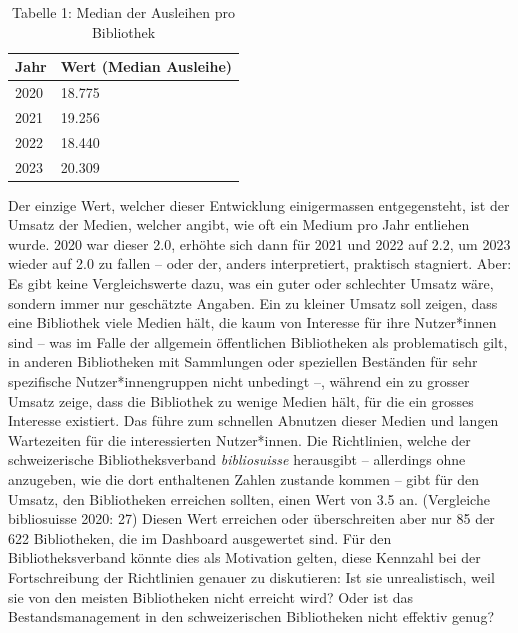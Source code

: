 \documentclass[a4paper,
fontsize=11pt,
oneside,
numbers=noperiodatend,
parskip=half-,
bibliography=totoc,
final
]{scrartcl}
\begin{document}
\begin{table}[]\centering
\begin{tabular}{|l|l|}
\hline
\textbf{Jahr} & \textbf{Wert (Median Ausleihe)} \\ \hline
2020          & 18.775                          \\ \hline
2021          & 19.256                          \\ \hline
2022          & 18.440                          \\ \hline
2023          & 20.309                          \\ \hline
\end{tabular}
\caption{Tabelle 1: Median der Ausleihen pro Bibliothek}
\end{table}

Der einzige Wert, welcher dieser Entwicklung einigermassen
entgegensteht, ist der Umsatz der Medien, welcher angibt, wie oft ein
Medium pro Jahr entliehen wurde. 2020 war dieser 2.0, erhöhte sich dann
für 2021 und 2022 auf 2.2, um 2023 wieder auf 2.0 zu fallen -- oder der,
anders interpretiert, praktisch stagniert. Aber: Es gibt keine
Vergleichswerte dazu, was ein guter oder schlechter Umsatz wäre, sondern
immer nur geschätzte Angaben. Ein zu kleiner Umsatz soll zeigen, dass
eine Bibliothek viele Medien hält, die kaum von Interesse für ihre
Nutzer*innen sind -- was im Falle der allgemein öffentlichen
Bibliotheken als problematisch gilt, in anderen Bibliotheken mit
Sammlungen oder speziellen Beständen für sehr spezifische
Nutzer*innengruppen nicht unbedingt --, während ein zu grosser Umsatz
zeige, dass die Bibliothek zu wenige Medien hält, für die ein grosses
Interesse existiert. Das führe zum schnellen Abnutzen dieser Medien und
langen Wartezeiten für die interessierten Nutzer*innen. Die Richtlinien,
welche der schweizerische Bibliotheksverband \emph{bibliosuisse}
herausgibt -- allerdings ohne anzugeben, wie die dort enthaltenen Zahlen
zustande kommen -- gibt für den Umsatz, den Bibliotheken erreichen
sollten, einen Wert von 3.5 an. (Vergleiche bibliosuisse 2020: 27)
Diesen Wert erreichen oder überschreiten aber nur 85 der 622
Bibliotheken, die im Dashboard ausgewertet sind. Für den
Bibliotheksverband könnte dies als Motivation gelten, diese Kennzahl bei
der Fortschreibung der Richtlinien genauer zu diskutieren: Ist sie
unrealistisch, weil sie von den meisten Bibliotheken nicht erreicht
wird? Oder ist das Bestandsmanagement in den schweizerischen
Bibliotheken nicht effektiv genug?
\end{document}
